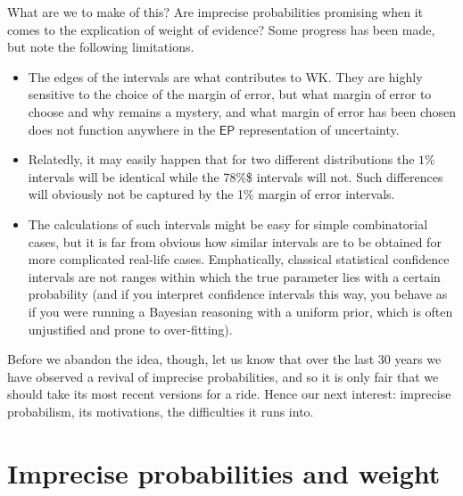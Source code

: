 \documentclass[
  10pt,
  dvipsnames,enabledeprecatedfontcommands]{scrartcl}
\begin{document}
What are we to make of this? Are imprecise probabilities promising when
it comes to the explication of weight of evidence? Some progress has
been made, but note the following limitations.

\begin{itemize}
\item
  The edges of the intervals are what contributes to \textsf{WK}. They
  are highly sensitive to the choice of the margin of error, but what
  margin of error to choose and why remains a mystery, and what margin
  of error has been chosen does not function anywhere in the
  \(\mathsf{EP}\) representation of uncertainty.
\item
  Relatedly, it may easily happen that for two different distributions
  the \(1\%\) intervals will be identical while the 78\%\$ intervals
  will not. Such differences will obviously not be captured by the 1\%
  margin of error intervals.
\item
  The calculations of such intervals might be easy for simple
  combinatorial cases, but it is far from obvious how similar intervals
  are to be obtained for more complicated real-life cases. Emphatically,
  classical statistical confidence intervals are not ranges within which
  the true parameter lies with a certain probability (and if you
  interpret confidence intervals this way, you behave as if you were
  running a Bayesian reasoning with a uniform prior, which is often
  unjustified and prone to over-fitting).
\end{itemize}

Before we abandon the idea, though, let us know that over the last 30
years we have observed a revival of imprecise probabilities, and so it
is only fair that we should take its most recent versions for a ride.
Hence our next interest: imprecise probabilism, its motivations, the
difficulties it runs into.

\hypertarget{imprecise-probabilities-and-weight}{%
\section{Imprecise probabilities and
weight}\label{imprecise-probabilities-and-weight}}
\end{document}
